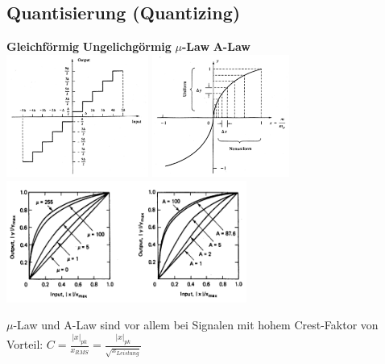 \subsection{Quantisierung (Quantizing)}
	\begin{center}	
		\textbf{Gleichförmig} \hspace{3cm}
		\textbf{Ungelichgörmig} \hspace{2.9cm}
		\textbf{$\mu$-Law} \hspace{3cm}
		\textbf{A-Law}  \\
		\includegraphics[height=4cm]{bilder/dig_quant_gleichfoermig.png} \hspace{0.5cm}
		\includegraphics[height=4cm]{bilder/dig_quant_ungleichfoermig.png} \hspace{0.5cm}
		\includegraphics[height=4cm]{bilder/dig_quant_lulaw_ralaw.png}	
	\end{center}
	$\mu$-Law und A-Law sind vor allem bei Signalen mit hohem Crest-Faktor von
	Vorteil: $C = \frac{\left|x\right|_{pk}}{x_{RMS}} =
	\frac{\left|x\right|_{pk}}{\sqrt{x_{Leistung}}}$
\renewcommand{\arraystretch}{1}


